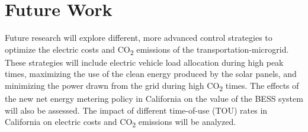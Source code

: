 \documentclass[conference,  usletter]{IEEEtran}
\begin{document}
\section{Future Work}
Future research will explore different, more advanced control strategies to optimize the electric costs and CO\textsubscript{2} emissions of the transportation-microgrid. These strategies will include electric vehicle load allocation during high peak times, maximizing the use of the clean energy produced by the solar panels, and minimizing the power drawn from the grid during high CO\textsubscript{2} times. The effects of the new net energy metering policy in California on the value of the BESS system will also be assessed. The impact of different time-of-use (TOU) rates in California on electric costs and CO\textsubscript{2} emissions will be analyzed.


		
		
	
\end{document}
